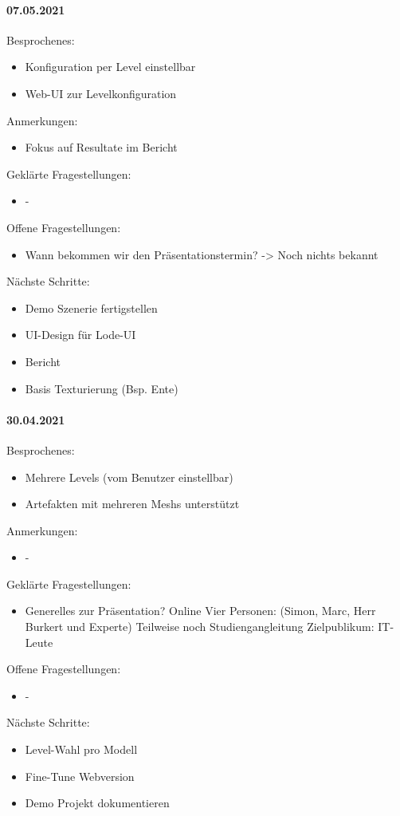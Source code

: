 \paragraph{07.05.2021}
Besprochenes:
\begin{itemize}
  \item Konfiguration per Level einstellbar
  \item Web-UI zur Levelkonfiguration
\end{itemize}
Anmerkungen:
\begin{itemize}
  \item Fokus auf Resultate im Bericht
\end{itemize}
Geklärte Fragestellungen:
\begin{itemize}
  \item -
\end{itemize}
Offene Fragestellungen:
\begin{itemize}
  \item Wann bekommen wir den Präsentationstermin? -> Noch nichts bekannt
\end{itemize}
Nächste Schritte:
\begin{itemize}
  \item Demo Szenerie fertigstellen
  \item UI-Design für Lode-UI
  \item Bericht
  \item Basis Texturierung (Bsp. Ente)
\end{itemize}

\newpage

\paragraph{30.04.2021}
Besprochenes:
\begin{itemize}
  \item Mehrere Levels (vom Benutzer einstellbar)
  \item {} Artefakten mit mehreren Meshs unterstützt
\end{itemize}
Anmerkungen:
\begin{itemize}
  \item -
\end{itemize}
Geklärte Fragestellungen:
\begin{itemize}
  \item Generelles zur Präsentation?
    \subitem Online
    \subitem Vier Personen: (Simon, Marc, Herr Burkert und Experte)
    \subitem Teilweise noch Studiengangleitung
    \subitem Zielpublikum: IT-Leute
\end{itemize}
Offene Fragestellungen:
\begin{itemize}
  \item -
\end{itemize}
Nächste Schritte:
\begin{itemize}
  \item Level-Wahl pro Modell
  \item Fine-Tune Webversion
  \item Demo Projekt dokumentieren
\end{itemize}

